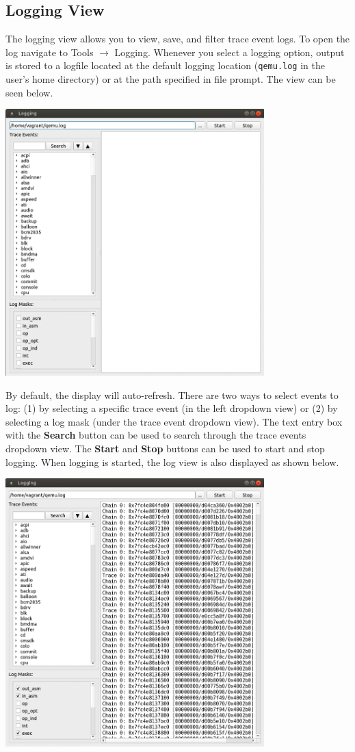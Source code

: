 \documentclass{article}
\newcommand{\code}[1]{\texttt{#1}}
\begin{document}
\subsection{Logging View}
The logging view allows you to view, save, and filter trace event logs. To open the log navigate to Tools $\rightarrow$ Logging. Whenever you select a logging option, output is stored to a logfile located at the default logging location (\code{qemu.log} in the user's home directory) or at the path specified in file prompt. The view can be seen below.
\begin{center}
    \includegraphics[width=100mm]{images/logging-view.png}
\end{center}
By default, the display will auto-refresh. There are two ways to select events to log: (1) by selecting a specific trace event (in the left dropdown view) or (2) by selecting a log mask (under the trace event dropdown view). The text entry box with the \textbf{Search} button can be used to search through the trace events dropdown view. The \textbf{Start} and \textbf{Stop} buttons can be used to start and stop logging. When logging is started, the log view is also displayed as shown below.
\begin{center}
    \includegraphics[width=100mm]{images/logging-view-populated.png}
\end{center}
\end{document}
